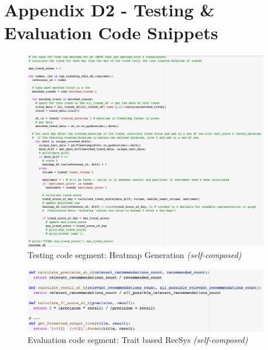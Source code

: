 \clearpage
\section*{Appendix D2 - Testing \& Evaluation Code Snippets}


\begin{figure}[h!]
\centering
\includegraphics[width=0.95\textwidth]{images/appendix/Implementation-test-eval/trends-testing-heatmap-data-prep.png}
\caption{Testing code segment: Heatmap Generation \textit{(self-composed)}}
\label{fig:code-model-testing-heatmap}
\end{figure}


\begin{figure}[h!]
\centering
\includegraphics[width=0.95\textwidth]{images/appendix/Implementation-test-eval/precision-recall-f1.png}
\caption{Evaluation code segment: Trait based RecSys \textit{(self-composed)}}
\end{figure}

